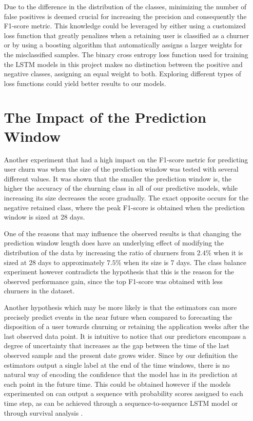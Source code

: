 \documentclass{kththesis}
\begin{document}
Due to the difference in the distribution of the classes, minimizing the number of false positives is deemed crucial for increasing the precision and consequently the F1-score metric. This knowledge could be leveraged by either using a customized loss function that greatly penalizes when a retaining user is classified as a churner or by using a boosting algorithm that automatically assigns a larger weights for the misclassified samples. The binary cross entropy loss function used for training the LSTM models in this project makes no distinction between the positive and negative classes, assigning an equal weight to both. Exploring different types of loss functions could yield better results to our models.

\section{The Impact of the Prediction Window}

Another experiment that had a high impact on the F1-score metric for predicting user churn was when the size of the prediction window was tested with several different values. It was shown that the smaller the prediction window is, the higher the accuracy of the churning class in all of our predictive models, while increasing its size decreases the score gradually. The exact opposite occurs for the negative retained class, where the peak F1-score is obtained when the prediction window is sized at 28 days.

One of the reasons that may influence the observed results is that changing the prediction window length does have an underlying effect of modifying the distribution of the data by increasing the ratio of churners from $2.4\%$ when it is sized at 28 days to approximately $7.5\%$ when its size is 7 days. The class balance experiment however contradicts the hypothesis that this is the reason for the observed performance gain, since the top F1-score was obtained with less churners in the dataset.

Another hypothesis which may be more likely is that the estimators can more precisely predict events in the near future when compared to forecasting the disposition of a user towards churning or retaining the application weeks after the last observed data point. It is intuitive to notice that our predictors encompass a degree of uncertainty that increases as the gap between the time of the last observed sample and the present date grows wider. Since by our definition the estimators output a single label at the end of the time windows, there is no natural way of encoding the confidence that the model has in its prediction at each point in the future time. This could be obtained however if the models experimented on can output a sequence with probability scores assigned to each time step, as can be achieved through a sequence-to-sequence LSTM \citep{cho2014learning} model or through survival analysis \citep{ibrahim2005bayesian}.
\end{document}
